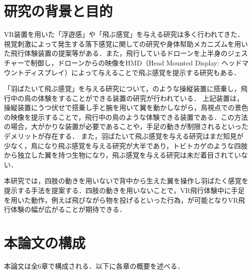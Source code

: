 \section{研究の背景と目的}

        VR装置を用いた「浮遊感」や「飛ぶ感覚」を与える研究は多く行われてきた．視覚刺激によって発生する落下感覚に関しての研究\cite{奥川夏輝2017VR空間における視覚刺激によって発生する落下感覚の分析}や身体幇助メカニズムを用いた飛行体験装置の提案\cite{鈴木拓馬2014hmd}等がある．また，飛行しているドローンを上半身のジェスチャーで制御し，ドローンからの映像をHMD（Head Mounted Display: ヘッドマウントディスプレイ）によって与えることで飛ぶ感覚を提示する研究\cite{rognon2018flyjacket}もある．


        「羽ばたいて飛ぶ感覚」を与える研究について，のような操縦装置に搭乗し，飛行中の鳥の体験をすることができる装置の研究が行われている\cite{rheiner2014birdly}\cite{hypersuit}．
        上記装置は，操縦装置にうつ伏せで搭乗し手と腕を用いて翼を動かしながら，鳥視点での景色の映像を提示することで，飛行中の鳥のような体験できる装置である．この方法の場合，大がかりな装置が必要であることや，手足の動きが制限されるといったデメリットが存在する．
        また，羽ばたいて飛ぶ感覚を与える研究はまだ知見が少なく，鳥になり飛ぶ感覚を与える研究が大半であり，トビトカゲのような四肢から独立した翼を持つ生物になり，飛ぶ感覚を与える研究は未だ着目されていない．

        本研究では，四肢の動きを用いないで背中から生えた翼を操作し羽ばたく感覚を提示する手法を提案する．四肢の動きを用いないことで，VR飛行体験中に手足を用いた動作，例えば飛びながら物を投げるといった行為，が可能となりVR飛行体験の幅が広がることが期待できる．

\section{本論文の構成}
        
        本論文は全6章で構成される．以下に各章の概要を述べる．

